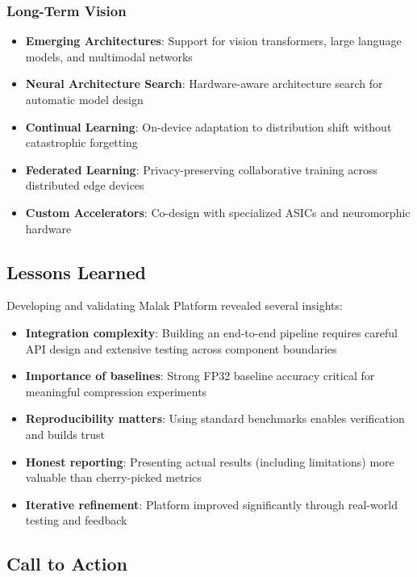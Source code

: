 \subsubsection{Long-Term Vision}
\begin{itemize}
\item \textbf{Emerging Architectures}: Support for vision transformers, large language models, and multimodal networks
\item \textbf{Neural Architecture Search}: Hardware-aware architecture search for automatic model design
\item \textbf{Continual Learning}: On-device adaptation to distribution shift without catastrophic forgetting
\item \textbf{Federated Learning}: Privacy-preserving collaborative training across distributed edge devices
\item \textbf{Custom Accelerators}: Co-design with specialized ASICs and neuromorphic hardware
\end{itemize}

\subsection{Lessons Learned}

Developing and validating Malak Platform revealed several insights:

\begin{itemize}
\item \textbf{Integration complexity}: Building an end-to-end pipeline requires careful API design and extensive testing across component boundaries
\item \textbf{Importance of baselines}: Strong FP32 baseline accuracy critical for meaningful compression experiments
\item \textbf{Reproducibility matters}: Using standard benchmarks enables verification and builds trust
\item \textbf{Honest reporting}: Presenting actual results (including limitations) more valuable than cherry-picked metrics
\item \textbf{Iterative refinement}: Platform improved significantly through real-world testing and feedback
\end{itemize}

\subsection{Call to Action}

